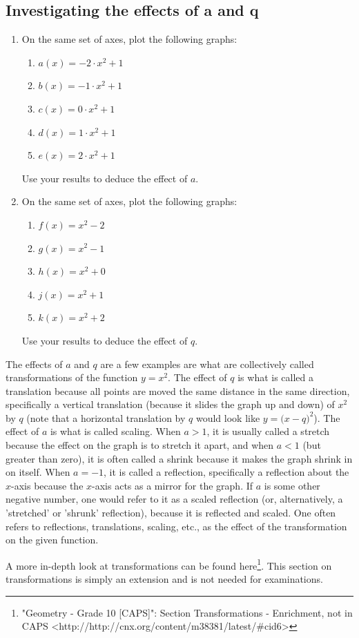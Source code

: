\subsection*{Investigating the effects of a and q }
\nopagebreak
\begin{enumerate}[noitemsep, label=\textbf{\arabic*}. ] 
\item On the same set of axes, plot the following graphs:
    \begin{enumerate}[noitemsep, label=\textbf{\alph*}. ] 
    \item $a(x)=-2\ensuremath{\cdot}{x}^{2}+1$
    \item $b(x)=-1\ensuremath{\cdot}{x}^{2}+1$
    \item $c(x)=0\ensuremath{\cdot}{x}^{2}+1$
    \item $d(x)=1\ensuremath{\cdot}{x}^{2}+1$
    \item $e(x)=2\ensuremath{\cdot}{x}^{2}+1$
    \end{enumerate}
Use your results to deduce the effect of $a$.
\item On the same set of axes, plot the following graphs:
    \begin{enumerate}[noitemsep, label=\textbf{\alph*}. ] 
    \item $f(x)={x}^{2}-2$
    \item $g(x)={x}^{2}-1$
    \item $h(x)={x}^{2}+0$
    \item $j(x)={x}^{2}+1$
    \item $k(x)={x}^{2}+2$
    \end{enumerate}
Use your results to deduce the effect of $q$.
\end{enumerate}
The effects of $a$ and $q$ are a few examples are what are collectively called transformations of the function $y={x}^{2}$. The effect of $q$ is what is called a translation because all points are moved the same distance in the same direction, specifically a vertical translation (because it slides the graph up and down) of ${x}^{2}$ by $q$ (note that a horizontal translation by $q$ would look like $y=(x-q{)}^{2}$). The effect of $a$ is what is called scaling. When $a>1$, it is usually called a stretch because the effect on the graph is to stretch it apart, and when $a<1$ (but greater than zero), it is often called a shrink because it makes the graph shrink in on itself. When $a=-1$, it is called a reflection, specifically a reflection about the $x$-axis because the $x$-axis acts as a mirror for the graph. If $a$ is some other negative number, one would refer to it as a scaled reflection (or, alternatively, a 'stretched' or 'shrunk' reflection), because it is reflected and scaled. One often refers to reflections, translations, scaling, etc., as the effect of the transformation on the given function.\par A more in-depth look at transformations can be found here\footnote{\raggedright{}"Geometry - Grade 10 [CAPS]": Section Transformations - Enrichment, not in CAPS <http://http://cnx.org/content/m38381/latest/\#cid6>}. This section on transformations is simply an extension and is not needed for examinations.\par 
